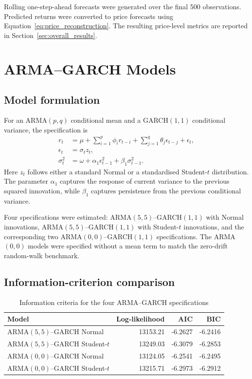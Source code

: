 \documentclass[10pt,a4paper]{article}
\begin{document}
Rolling one-step-ahead forecasts were generated over the final 500 observations. Predicted returns were converted to price forecasts using Equation~\eqref{eq:price_reconstruction}. The resulting price-level metrics are reported in Section~\ref{sec:overall_results}.

\section{ARMA--GARCH Models}

\subsection{Model formulation}

For an ARMA$(p,q)$ conditional mean and a GARCH$(1,1)$ conditional variance, the specification is
\begin{align}
  r_t &= \mu + \sum_{i=1}^{p}\phi_i r_{t-i}
       + \sum_{j=1}^{q}\theta_j\epsilon_{t-j}+\epsilon_t, \\
  \epsilon_t &= \sigma_t z_t, \\
  \sigma_t^2 &= \omega+\alpha_1\epsilon_{t-1}^2+\beta_1\sigma_{t-1}^2.
\end{align}
Here $z_t$ follows either a standard Normal or a standardised Student-$t$ distribution. The parameter $\alpha_1$ captures the response of current variance to the previous squared innovation, while $\beta_1$ captures persistence from the previous conditional variance.

Four specifications were estimated: ARMA$(5,5)$--GARCH$(1,1)$ with Normal innovations, ARMA$(5,5)$--GARCH$(1,1)$ with Student-$t$ innovations, and the corresponding two ARMA$(0,0)$--GARCH$(1,1)$ specifications. The ARMA$(0,0)$ models were specified without a mean term to match the zero-drift random-walk benchmark.

\subsection{Information-criterion comparison}

\begin{table}[H]
\centering
\caption{Information criteria for the four ARMA--GARCH specifications}
\small
\begin{tabular}{lrrr}
\toprule
Model & Log-likelihood & AIC & BIC \\
\midrule
ARMA$(5,5)$--GARCH Normal & 13153.21 & -6.2627 & -6.2416 \\
ARMA$(5,5)$--GARCH Student-$t$ & 13249.03 & -6.3079 & -6.2853 \\
ARMA$(0,0)$--GARCH Normal & 13124.05 & -6.2541 & -6.2495 \\
ARMA$(0,0)$--GARCH Student-$t$ & 13215.71 & -6.2973 & -6.2912 \\
\bottomrule
\end{tabular}
\label{tab:garch_ic}
\end{table}
\end{document}
